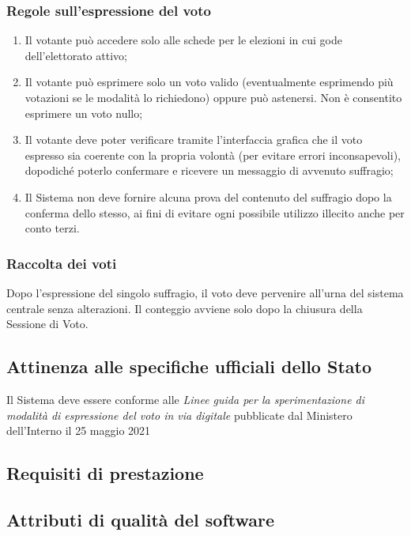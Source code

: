 \documentclass{report}
\begin{document}
\subsubsection{Regole sull'espressione del voto}
\begin{enumerate}
	\item Il votante può accedere solo alle schede per le elezioni in cui gode dell'elettorato attivo;
	\item Il votante può esprimere solo un voto valido (eventualmente esprimendo più votazioni se le modalità lo richiedono) oppure può astenersi. Non è consentito esprimere un voto nullo;
	\item Il votante deve poter verificare tramite l'interfaccia grafica che il voto espresso sia coerente con la propria volontà (per evitare errori inconsapevoli), dopodiché poterlo confermare e ricevere un messaggio di avvenuto suffragio;
	\item Il Sistema non deve fornire alcuna prova del contenuto del suffragio dopo la conferma dello stesso, ai fini di evitare ogni possibile utilizzo illecito anche per conto terzi.
\end{enumerate}

\subsubsection{Raccolta dei voti}
Dopo l'espressione del singolo suffragio, il voto deve pervenire all'urna del sistema centrale senza alterazioni. Il conteggio avviene solo dopo la chiusura della Sessione di Voto.


\subsection{Attinenza alle specifiche ufficiali dello Stato}
Il Sistema deve essere conforme alle \textit{Linee  guida  per  la  sperimentazione  di  modalità  di  espressione  del  voto  in  via digitale} pubblicate dal Ministero dell'Interno il 25 maggio 2021


\subsection{Requisiti di prestazione}


\subsection{Attributi di qualità del software}
\end{document}
